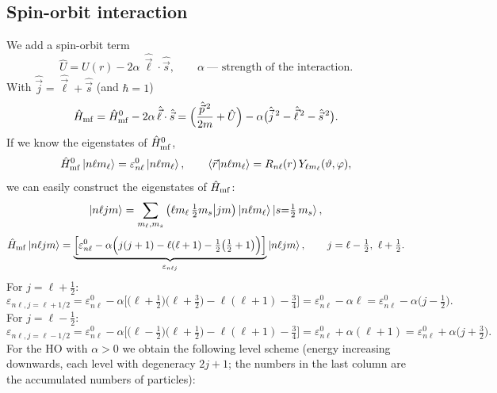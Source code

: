 \documentclass[11pt,a4paper]{article}
\newcommand{\op}[1]{\hat{#1}}
\begin{document}
\subsection{Spin-orbit interaction}
We add a spin-orbit term
\[
\op U=U(r)-2\alpha\,\op{\vec\ell}\cdot\op{\vec s},\qquad \alpha\ \text{--- strength of the interaction}.
\]
With $\op{\vec j}=\op{\vec\ell}+\op{\vec s}$ (and $\hbar=1$)
\[
\op H_{\rm mf}=\op H^0_{\rm mf}-2\alpha\,\op{\vec\ell}\cdot\op{\vec s}
=\Big(\frac{\op{\vec p}^{\,2}}{2m}+\op U\Big)-\alpha\big(\op{\vec j}^{\,2}-\op{\vec\ell}^{\,2}-\op{\vec s}^{\,2}\big).
\]
If we know the eigenstates of $\op H^0_{\rm mf}$,
\[
\op H^0_{\rm mf}\ket{n\ell m_\ell}=\varepsilon^0_{n\ell}\ket{n\ell m_\ell},\qquad
\braket{\vec r|n\ell m_\ell}=R_{n\ell}(r)\,Y_{\ell m_\ell}(\vartheta,\varphi),
\]
we can easily construct the eigenstates of $\op H_{\rm mf}$:
\[
\ket{n\ell jm}=\sum_{m_\ell,m_s}\big(\ell m_\ell\,\tfrac12 m_s\big|jm\big)\ket{n\ell m_\ell}\ket{s{=}\tfrac12\,m_s},
\]
\[
\op H_{\rm mf}\ket{n\ell jm}=\underbrace{\Big[\varepsilon^0_{n\ell}-\alpha\Big(j(j+1)-\ell(\ell+1)-\tfrac12\big(\tfrac12+1\big)\Big)\Big]}_{\varepsilon_{n\ell j}}\ket{n\ell jm},
\qquad j=\ell-\tfrac12,\ \ell+\tfrac12 .
\]
For $j=\ell+\frac12$:
\[
\varepsilon_{n\ell,j=\ell+1/2}=\varepsilon^0_{n\ell}-\alpha\Big[\big(\ell+\tfrac12\big)\big(\ell+\tfrac32\big)-\ell(\ell+1)-\tfrac34\Big]
=\varepsilon^0_{n\ell}-\alpha\ell=\varepsilon^0_{n\ell}-\alpha\big(j-\tfrac12\big).
\]
For $j=\ell-\frac12$:
\[
\varepsilon_{n\ell,j=\ell-1/2}=\varepsilon^0_{n\ell}-\alpha\Big[\big(\ell-\tfrac12\big)\big(\ell+\tfrac12\big)-\ell(\ell+1)-\tfrac34\Big]
=\varepsilon^0_{n\ell}+\alpha(\ell+1)=\varepsilon^0_{n\ell}+\alpha\big(j+\tfrac32\big).
\]
For the HO with $\alpha>0$ we obtain the following level scheme (energy increasing downwards, each level with degeneracy $2j+1$; the numbers in the last column are the accumulated numbers of particles):
\end{document}
